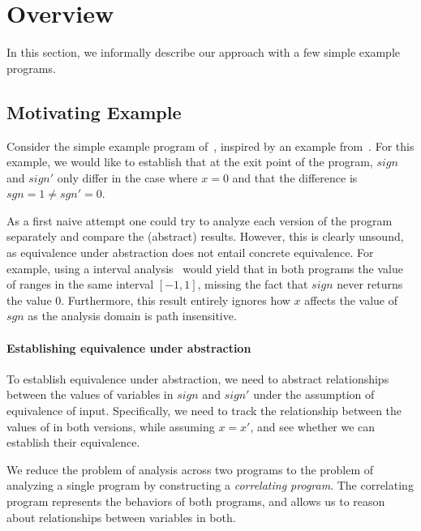 \section{Overview}

In this section, we informally describe our approach with a few simple example programs.

\subsection{Motivating Example}



Consider the simple example program of~, inspired by an example from~\cite{RM:TOPLAS07}. For this example, we would like to establish that at the exit point of the program, $sign$ and $sign'$ only differ in the case where $x=0$ and that the difference is $sgn = 1 \neq sgn' = 0$.

As a first naive attempt one could try to analyze each version of the program separately and compare the (abstract) results. However, this is clearly unsound, as equivalence under abstraction does not entail concrete equivalence. For example, using a interval analysis~\cite{TODO} would yield that in both programs the value of  ranges in the same interval $[-1,1]$, missing the fact that $sign$ never returns the value $0$. Furthermore, this result entirely ignores how $x$ affects the value of $sgn$ as the analysis domain is path insensitive.

\paragraph{Establishing equivalence under abstraction}
To establish equivalence under abstraction, we need to abstract relationships between the values of variables in $sign$ and $sign'$ under the assumption of equivalence of input. Specifically, we need to track the relationship between the values of  in both versions, while assuming $x=x'$, and see whether we can establish their equivalence.


We reduce the problem of analysis across two programs to the problem of analyzing a single program by constructing a \emph{correlating program}. The correlating program represents the behaviors of both programs, and allows us to reason about relationships between variables in both. 

